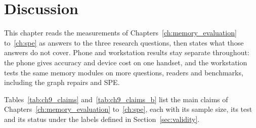 
\chapter{Discussion}
\label{ch:discussion}

This chapter reads the measurements of Chapters~\ref{ch:memory_evaluation} to~\ref{ch:spe} as
answers to the three research questions, then states what those answers do not cover. Phone and
workstation results stay separate throughout: the phone gives accuracy and device cost on one
handset, and the workstation tests the same memory modules on more questions, readers and
benchmarks, including the graph repairs and SPE.

Tables~\ref{tab:ch9_claims} and~\ref{tab:ch9_claims_b} list the main claims of
Chapters~\ref{ch:memory_evaluation} to~\ref{ch:spe}, each with its sample size, its test and its
status under the labels defined in Section~\ref{sec:validity}.

